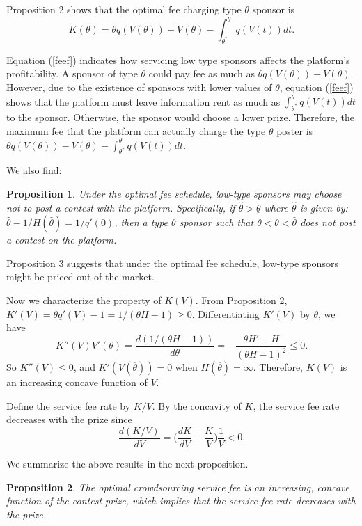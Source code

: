 \documentclass[12pt]{article}
\newtheorem{Proposition}{Proposition}
\begin{document}
Proposition 2 shows that the optimal fee charging
type $\theta$ sponsor is
\begin{equation}
K(\theta)=\theta q(V(\theta))-V(\theta)-\int_{\theta^{*}}^{\theta}q(V(t))dt.\label{feef}
\end{equation}

Equation (\ref{feef}) indicates how servicing low type sponsors affects
the platform's profitability. A sponsor
of type $\theta$ could pay fee as much as $\theta q(V(\theta))-V(\theta)$.
However, due to the existence of sponsors with lower values of $\theta$,
equation (\ref{feef}) shows that the platform must leave information
rent as much as $\int_{\theta^{*}}^{\theta}q(V(t))dt$ to the sponsor.
Otherwise, the sponsor would choose a lower prize. Therefore, the
maximum fee that the platform can actually charge the type $\theta$
poster is $\theta q(V(\theta))-V(\theta)-\int_{\theta^{*}}^{\theta}q(V(t))dt$.

We also find:
\begin{Proposition} Under the optimal fee schedule, low-type sponsors
may choose not to post a contest with the platform. Specifically,  if $\hat{\theta}>\underline{\theta}$ where $\hat{\theta}$ is given by: $\hat{\theta}-1/H(\hat{\theta})=1/q'(0)$, then a type $\theta$ sponsor such that $\underline{\theta}<\theta<\hat{\theta}$ does not post a contest on the platform. \end{Proposition}

Proposition 3 suggests that under the optimal fee schedule, low-type sponsors
might be priced out of the market.

Now we characterize the property of $K(V)$. From Proposition 2, $K'(V)=\theta q'(V)-1=1/(\theta H-1)\geq0$.
Differentiating $K'(V)$ by $\theta$, we have
\begin{equation}
K''(V)V'(\theta)=\frac{d(1/(\theta H-1))}{d\theta}=-\frac{\theta H'+H}{(\theta H-1)^{2}}\leq0.
\end{equation}
So $K''(V)\leq0$, and $K'(V(\overline{\theta}))=0$ when $H(\overline{\theta})=\infty$.
Therefore, $K(V)$ is an increasing concave function of $V$.

Define the service fee rate by $K/V$. By the concavity of $K$, the
service fee rate decreases with the prize since
\begin{equation}
\frac{d(K/V)}{dV}=\Big(\frac{dK}{dV}-\frac{K}{V}\Big)\frac{1}{V}<0.
\end{equation}


We summarize the above results in the next proposition. \begin{Proposition}
The optimal crowdsourcing service fee is an increasing, concave function
of the contest prize, which implies that the service fee rate decreases
with the prize. \end{Proposition}
\end{document}

